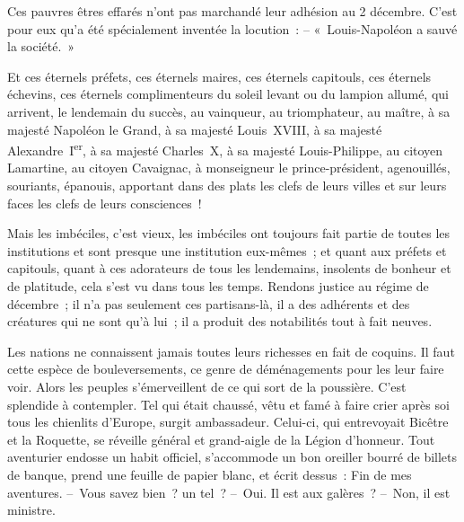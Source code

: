\documentclass[french,twoside]{book} %
\begin{document}
Ces pauvres êtres effarés n’ont pas marchandé leur adhésion au 2 décembre. C’est pour eux qu’a été spécialement inventée la locution : – « Louis-Napoléon a sauvé la société. »\par
Et ces éternels préfets, ces éternels maires, ces éternels capitouls, ces éternels échevins, ces éternels complimenteurs du soleil levant ou du lampion allumé, qui arrivent, le lendemain du succès, au vainqueur, au triomphateur, au maître, à sa majesté Napoléon le Grand, à sa majesté Louis XVIII, à sa majesté Alexandre I\textsuperscript{er}, à sa majesté Charles X, à sa majesté Louis-Philippe, au citoyen Lamartine, au citoyen Cavaignac, à monseigneur le prince-président, agenouillés, souriants, épanouis, apportant dans des plats les clefs de leurs villes et sur leurs faces les clefs de leurs consciences !\par
Mais les imbéciles, c’est vieux, les imbéciles ont toujours fait partie de toutes les institutions et sont presque une institution eux-mêmes ; et quant aux préfets et capitouls, quant à ces adorateurs de tous les lendemains, insolents de bonheur et de platitude, cela s’est vu dans tous les temps. Rendons justice au régime de décembre ; il n’a pas seulement ces partisans-là, il a des adhérents et des créatures qui ne sont qu’à lui ; il a produit des notabilités tout à fait neuves.\par
Les nations ne connaissent jamais toutes leurs richesses en fait de coquins. Il faut cette espèce de bouleversements, ce genre de déménagements pour les leur faire voir. Alors les peuples s’émerveillent de ce qui sort de la poussière. C’est splendide à contempler. Tel qui était chaussé, vêtu et famé à faire crier après soi tous les chienlits d’Europe, surgit ambassadeur. Celui-ci, qui entrevoyait Bicêtre et la Roquette, se réveille général et grand-aigle de la Légion d’honneur. Tout aventurier endosse un habit officiel, s’accommode un bon oreiller bourré de billets de banque, prend une feuille de papier blanc, et écrit dessus : Fin de mes aventures. – Vous savez bien ? un tel ? – Oui. Il est aux galères ? – Non, il est ministre.
\end{document}
